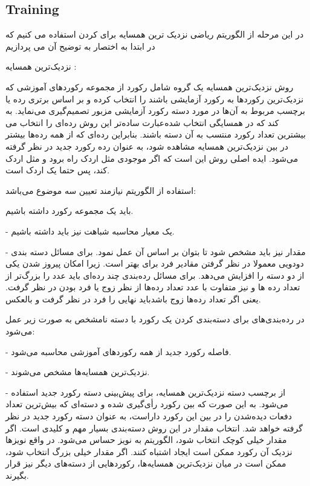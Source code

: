 \documentclass[oneside]{article}
\begin{document}
\subsection{Training}
در این مرحله از الگوریتم ریاضی نزدیک ترین همسایه برای
کردن استفاده می کنیم که در ابتدا به اختصار به توضیح آن می پردازیم

نزدیک‌ترین همسایه 
:

روش
نزدیک‌ترین همسایه یک گروه شامل 
رکورد از مجموعه رکورد‌های آموزشی که نزدیک‌ترین رکورد‌ها به رکورد آزمایشی باشند را انتخاب کرده و بر اساس برتری رده یا برچسب مربوط به آن‌ها در مورد دسته رکورد آزمایشی مزبور تصمیم‌گیری می‌نماید. به عبارت ساده‌تر این روش رده‌ای را انتخاب می‎‌کند که در همسایگی انتخاب شده بیشترین تعداد رکورد منتسب به آن دسته باشند. بنابراین رده‌ای که از همه رده‌ها بیشتر در بین 
نزدیک‌ترین همسایه مشاهده شود، به عنوان رده رکورد جدید در نظر گرفته می‌شود. ایده اصلی روش 
این است که اگر موجودی مثل اردک راه برود و مثل اردک
کند، پس حتما یک اردک است. 

استفاده از الگوریتم 
نیازمند تعیین سه موضوع می‌باشد: 

باید یک مجموعه رکورد داشته باشیم. 

- یک معیار محاسبه شباهت نیز باید داشته باشیم. 

- مقدار 
نیز باید مشخص شود تا بتوان بر اساس آن عمل نمود. برای مسائل دسته بندی دودویی معمولا در نظر گرفتن مقادیر فرد برای 
بهتر است. زیرا امکان پیروز شدن یکی از دو دسته را افزایش می‌دهد. برای مسائل رده‌بندی چند رده‌ای باید عدد
را بزرگ‌تر از تعداد رده ها و نیز متفاوت با عدد تعداد رده‌ها از نظر زوج یا فرد بودن در نظر گرفت. یعنی اگر تعداد رده‌ها زوج باشدباید 
نهایی را فرد در نظر گرفت و بالعکس. 

در رده‌بندی‌های 
برای دسته‌بندی کردن یک رکورد با دسته نا‌مشخص به صورت زیر عمل می‌شود: 

- فاصله رکورد جدید از همه رکورد‌های آموزشی محاسبه می‌شود. 

- نزدیک‌ترین همسایه‌ها مشخص می‌شوند. 

- از برچسب دسته 
نزدیک‌ترین همسایه، برای پیش‌بینی دسته رکورد جدید استفاده می‌شود. به این صورت که بین 
رکورد رأی‌گیری شده و دسته‌ای که بیش‌ترین تعداد دفعات دیده‌شدن را در بین این
رکورد داراست، به عنوان دسته رکورد جدید در نظر گرفته خواهد شد. انتخاب مقدار 
در این روش دسته‌بندی بسیار مهم و کلیدی است. اگر مقدار 
خیلی کوچک انتخاب شود، الگوریتم به نویز حساس می‌شود. در واقع نویز‌ها نزدیک آن رکورد ممکن است ایجاد اشتباه کنند. اگر مقدار 
خیلی بزرگ انتخاب شود، ممکن است در میان نزدیک‌ترین همسایه‌ها، رکورد‌هایی از دسته‌های دیگر نیز قرار بگیرند.
\end{document}
